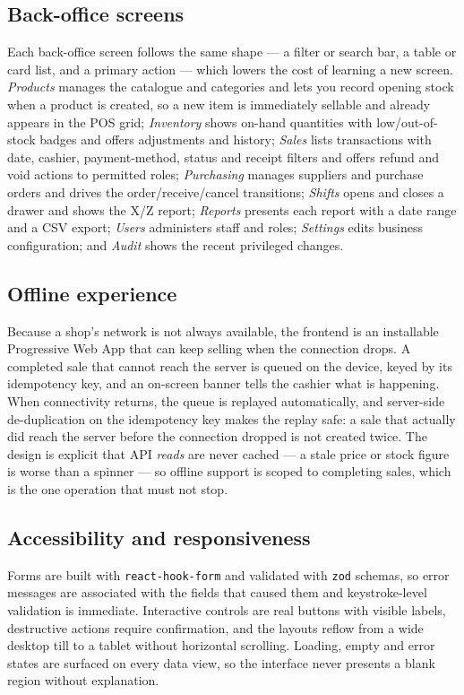 \documentclass[11pt,a4paper]{article}
\begin{document}
\subsection{Back-office screens}

Each back-office screen follows the same shape --- a filter or search bar, a table or card list, and a
primary action --- which lowers the cost of learning a new screen. \emph{Products} manages the
catalogue and categories and lets you record opening stock when a product is created, so a new item
is immediately sellable and already appears in the POS grid; \emph{Inventory} shows on-hand
quantities with low/out-of-stock badges and
offers adjustments and history; \emph{Sales} lists transactions with date, cashier, payment-method,
status and receipt filters and offers refund and void actions to permitted roles; \emph{Purchasing}
manages suppliers and purchase orders and drives the order/receive/cancel transitions;
\emph{Shifts} opens and closes a drawer and shows the X/Z report; \emph{Reports} presents each report
with a date range and a CSV export; \emph{Users} administers staff and roles; \emph{Settings} edits
business configuration; and \emph{Audit} shows the recent privileged changes.

\subsection{Offline experience}

Because a shop's network is not always available, the frontend is an installable Progressive Web App
that can keep selling when the connection drops. A completed sale that cannot reach the server is
queued on the device, keyed by its idempotency key, and an on-screen banner tells the cashier what is
happening. When connectivity returns, the queue is replayed automatically, and server-side
de-duplication on the idempotency key makes the replay safe: a sale that actually did reach the
server before the connection dropped is not created twice. The design is explicit that API
\emph{reads} are never cached --- a stale price or stock figure is worse than a spinner --- so offline
support is scoped to completing sales, which is the one operation that must not stop.

\subsection{Accessibility and responsiveness}

Forms are built with \texttt{react-hook-form} and validated with \texttt{zod} schemas, so error
messages are associated with the fields that caused them and keystroke-level validation is immediate.
Interactive controls are real buttons with visible labels, destructive actions require confirmation,
and the layouts reflow from a wide desktop till to a tablet without horizontal scrolling. Loading,
empty and error states are surfaced on every data view, so the interface never presents a blank region
without explanation.
\end{document}

